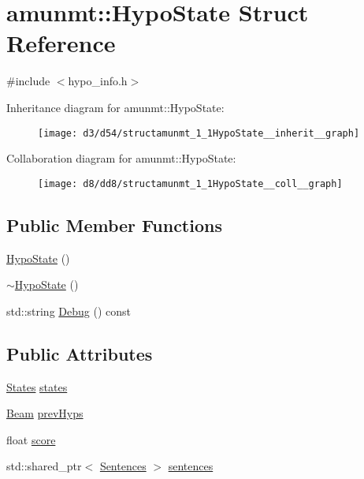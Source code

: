 \hypertarget{structamunmt_1_1HypoState}{}\section{amunmt\+:\+:Hypo\+State Struct Reference}
\label{structamunmt_1_1HypoState}


{\ttfamily \#include $<$hypo\+\_\+info.\+h$>$}



Inheritance diagram for amunmt\+:\+:Hypo\+State\+:
\nopagebreak
\begin{figure}[H]
\begin{center}
\leavevmode
\texttt{[image: d3/d54/structamunmt\_1\_1HypoState\_\_inherit\_\_graph]}
\end{center}
\end{figure}


Collaboration diagram for amunmt\+:\+:Hypo\+State\+:
\nopagebreak
\begin{figure}[H]
\begin{center}
\leavevmode
\texttt{[image: d8/dd8/structamunmt\_1\_1HypoState\_\_coll\_\_graph]}
\end{center}
\end{figure}
\subsection*{Public Member Functions}
\begin{DoxyCompactItemize}
\item 
\hyperlink{structamunmt_1_1HypoState_aca74e0b25cec0f3c771ffca70600742e}{Hypo\+State} ()
\item 
\hyperlink{structamunmt_1_1HypoState_aab6f4f189b148ff9cad6b68c08f9bf5c}{$\sim$\+Hypo\+State} ()
\item 
std\+::string \hyperlink{structamunmt_1_1HypoState_a896dd4663ba4656199bbde6fc0b081c9}{Debug} () const 
\end{DoxyCompactItemize}
\subsection*{Public Attributes}
\begin{DoxyCompactItemize}
\item 
\hyperlink{namespaceamunmt_a4fe2912e208820f8217fbcf229ebacf7}{States} \hyperlink{structamunmt_1_1HypoState_aaf08886f1ee6a0723bb9e9cad5737a9d}{states}
\item 
\hyperlink{namespaceamunmt_a534a3a9a1d99c01a5adf05e700a26012}{Beam} \hyperlink{structamunmt_1_1HypoState_aaf4149cac6aad8872d493bca36953b48}{prev\+Hyps}
\item 
float \hyperlink{structamunmt_1_1HypoState_a2ae5a8d48d818badc61ed4b2e367ed8a}{score}
\item 
std\+::shared\+\_\+ptr$<$ \hyperlink{classamunmt_1_1Sentences}{Sentences} $>$ \hyperlink{structamunmt_1_1HypoState_aef7182ec23fafad9872aecde19805822}{sentences}
\end{DoxyCompactItemize}


